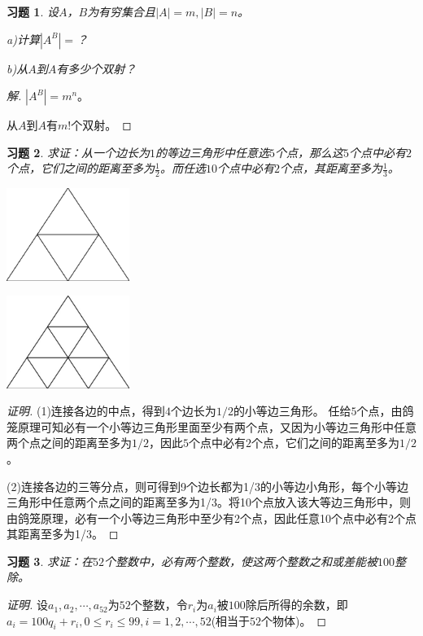 \documentclass{article}
\begin{document}
\begin{CJK}{UTF8}{gbsn}
\newtheorem{Exercise}{习题}
\begin{Exercise}
  设$A$，$B$为有穷集合且$|A|=m, |B|=n$。

  a)计算$|A^B|=$？


  b)从$A$到$A$有多少个双射？
\end{Exercise}
\begin{proof}[解]
  $|A^B|=m^n$。

  从$A$到$A$有$m!$个双射。
\end{proof}
\begin{Exercise}
求证：从一个边长为$1$的等边三角形中任意选$5$个点，那么这$5$个点中必有$2$个点，它们之间的距离至多为$\frac{1}{2}$。而任选$10$个点中必有$2$个点，其距离至多为$\frac{1}{3}$。
\end{Exercise}

\begin{minipage}{0.49\linewidth}
  \includegraphics[width=4cm,height=3cm]{triangles2}
\end{minipage}
\begin{minipage}{0.49\linewidth}
  \includegraphics[width=4cm,height=3cm]{triangles3.jpg}
\end{minipage}

\begin{proof}[证明]




  (1)连接各边的中点，得到$4$个边长为$1/2$的小等边三角形。
  任给$5$个点，由鸽笼原理可知必有一个小等边三角形里面至少有两个点，又因为小等边三角形中任意两个点之间的距离至多为$1/2$，因此$5$个点中必有$2$个点，它们之间的距离至多为$1/2$。

(2)连接各边的三等分点，则可得到9个边长都为1/3的小等边小角形，每个小等边三角形中任意两个点之间的距离至多为1/3。将10个点放入该大等边三角形中，则由鸽笼原理，必有一个小等边三角形中至少有2个点，因此任意10个点中必有2个点其距离至多为1/3。
\end{proof}
\begin{Exercise}
  求证：在$52$个整数中，必有两个整数，使这两个整数之和或差能被$100$整除。
\end{Exercise}
\begin{proof}[证明]
  设$a_1,a_2,\cdots,a_{52}$为$52$个整数，令$r_i$为$a_i$被$100$除后所得的余数，即$a_i=100q_i+r_i,0\leq r_i \leq 99, i = 1,2,\cdots,52$(相当于$52$个物体)。


\end{proof}
\end{CJK}
\end{document}
